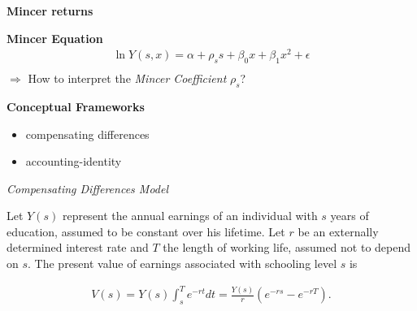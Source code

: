 \begin{frame}\begin{center}
\LARGE\textbf{Mincer returns}
\end{center}\end{frame}
\begin{frame}
\textbf{Mincer Equation}\\
\begin{align*}
\ln{Y(s, x)} = \alpha + \rho_s s + \beta_0 x + \beta_1 x^2 + \epsilon\\
\end{align*}
$\Rightarrow$ How to interpret the \textit{Mincer Coefficient} $\rho_s$?
\end{frame}
\begin{frame}\textbf{Conceptual Frameworks}\vspace{0.3cm}
\begin{itemize}\setlength\itemsep{1em}
\item compensating differences
\item accounting-identity
\end{itemize}
\end{frame}
\begin{frame}\begin{center}
\LARGE\textit{Compensating Differences Model}
\end{center}\end{frame}
\begin{frame}
Let $Y(s)$ represent the annual earnings of an individual with $s$ years of education, assumed to be constant over his lifetime. Let $r$ be an externally determined interest rate and $T$ the length of working life, assumed not to depend on $s$. The present value of earnings associated with schooling level $s$ is

\begin{align*}
V(s) = Y(s)\int_s^T e^{-rt} dt = \frac{Y(s)}{r}(e^{-rs} - e^{-rT}).
\end{align*}
\end{frame}
